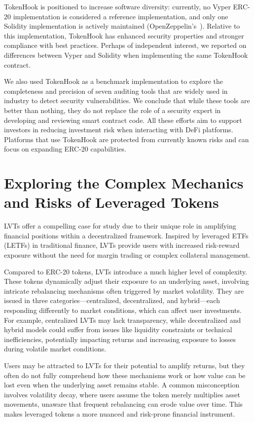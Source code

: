 TokenHook is positioned to increase software diversity: currently, no Vyper ERC-20 implementation is considered a reference implementation, and only one Solidity implementation is actively maintained (OpenZeppelin's~\cite{OpenZeppelin_Token}). Relative to this implementation, TokenHook has enhanced security properties and stronger compliance with best practices. Perhaps of independent interest, we reported on differences between Vyper and Solidity when implementing the same TokenHook contract. 

We also used TokenHook as a benchmark implementation to explore the completeness and precision of seven auditing tools that are widely used in industry to detect security vulnerabilities. We conclude that while these tools are better than nothing, they do not replace the role of a security expert in developing and reviewing smart contract code. All these efforts aim to support investors in reducing investment risk when interacting with DeFi platforms. Platforms that use TokenHook are protected from currently known risks and can focus on expanding ERC-20 capabilities.

\section{Exploring the Complex Mechanics and Risks of Leveraged Tokens}
LVTs offer a compelling case for study due to their unique role in amplifying financial positions within a decentralized framework. Inspired by leveraged ETFs (LETFs) in traditional finance, LVTs provide users with increased risk-reward exposure without the need for margin trading or complex collateral management.

Compared to ERC-20 tokens, LVTs introduce a much higher level of complexity. These tokens dynamically adjust their exposure to an underlying asset, involving intricate rebalancing mechanisms often triggered by market volatility. They are issued in three categories—centralized, decentralized, and hybrid—each responding differently to market conditions, which can affect user investments. For example, centralized LVTs may lack transparency, while decentralized and hybrid models could suffer from issues like liquidity constraints or technical inefficiencies, potentially impacting returns and increasing exposure to losses during volatile market conditions.

Users may be attracted to LVTs for their potential to amplify returns, but they often do not fully comprehend how these mechanisms work or how value can be lost even when the underlying asset remains stable. A common misconception involves volatility decay, where users assume the token merely multiplies asset movements, unaware that frequent rebalancing can erode value over time. This makes leveraged tokens a more nuanced and risk-prone financial instrument.

